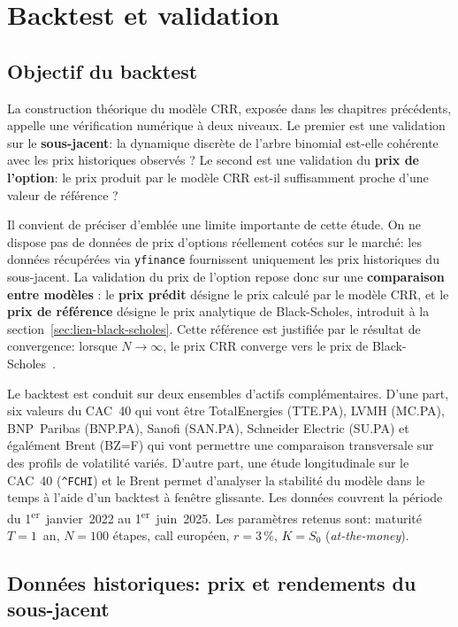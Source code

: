 \documentclass[11pt]{report}
\begin{document}
\chapter{Backtest et validation}

\section{Objectif du backtest}

La construction théorique du modèle CRR, exposée dans les chapitres
précédents, appelle une vérification numérique à deux niveaux. Le
premier est une validation sur le \textbf{sous-jacent}: la dynamique
discrète de l'arbre binomial est-elle cohérente avec les prix
historiques observés ? Le second est une validation du \textbf{prix
de l'option}: le prix produit par le modèle CRR est-il suffisamment
proche d'une valeur de référence ?

Il convient de préciser d'emblée une limite importante de cette étude.
On ne dispose pas de données de prix d'options réellement cotées sur
le marché: les données récupérées via \texttt{yfinance} fournissent
uniquement les prix historiques du sous-jacent. La validation du prix
de l'option repose donc sur une \textbf{comparaison entre modèles} :
le \textbf{prix prédit} désigne le prix calculé par le modèle CRR, et
le \textbf{prix de référence} désigne le prix analytique de
Black-Scholes, introduit à la section~\ref{sec:lien-black-scholes}.
Cette référence est justifiée par le résultat de convergence: lorsque
$N \to \infty$, le prix CRR converge vers le prix de
Black-Scholes~\cite{crr1979}.

Le backtest est conduit sur deux ensembles d'actifs complémentaires.
D'une part, six valeurs du CAC~40 qui vont être TotalEnergies (TTE.PA), LVMH
(MC.PA), BNP~Paribas (BNP.PA), Sanofi (SAN.PA), Schneider Electric
(SU.PA) et égalément Brent (BZ=F) qui vont permettre une comparaison transversale
sur des profils de volatilité variés. D'autre part, une étude
longitudinale sur le CAC~40 (\texttt{\^{}FCHI}) et le Brent permet
d'analyser la stabilité du modèle dans le temps à l'aide d'un backtest
à fenêtre glissante. Les données couvrent la période du
1\textsuperscript{er}~janvier~2022 au 1\textsuperscript{er}~juin~2025.
Les paramètres retenus sont: maturité $T = 1$~an, $N = 100$ étapes,
call européen, $r = 3\,\%$, $K = S_0$ (\textit{at-the-money}).

\section{Données historiques: prix et rendements du sous-jacent}
\end{document}
